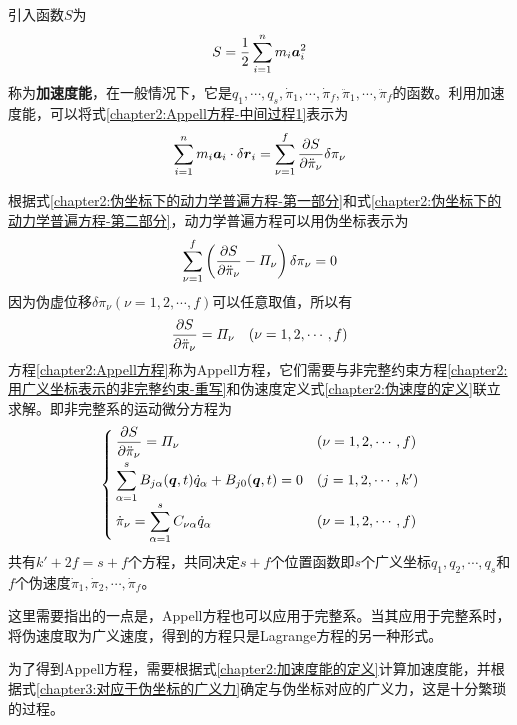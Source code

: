 引入函数$S$为
\begin{equation}
	S = \frac12 \sum_{i=1}^n m_i\boldsymbol{a}_i^2 
	\label{chapter2:加速度能的定义}
\end{equation}
称为{\bf 加速度能}，在一般情况下，它是$q_1,\cdots,q_s, \dot{\pi}_1,\cdots,\dot{\pi}_f, \ddot{\pi}_1,\cdots,\ddot{\pi}_f$的函数。利用加速度能，可以将式\eqref{chapter2:Appell方程-中间过程1}表示为
\begin{equation}
	\sum_{i=1}^n m_i\boldsymbol{a}_i\cdot\delta\boldsymbol{r}_i = \sum_{\nu=1}^f \frac{\partial S}{\partial \ddot{\pi}_\nu} \delta\pi_\nu
	\label{chapter2:伪坐标下的动力学普遍方程-第二部分}
\end{equation}

根据式\eqref{chapter2:伪坐标下的动力学普遍方程-第一部分}和式\eqref{chapter2:伪坐标下的动力学普遍方程-第二部分}，动力学普遍方程可以用伪坐标表示为
\begin{equation}
	\sum_{\nu=1}^f \left(\frac{\partial S}{\partial \ddot{\pi}_\nu} - \varPi_\nu\right) \delta\pi_\nu = 0
\end{equation}
因为伪虚位移$\delta\pi_\nu(\nu=1,2,\cdots,f)$可以任意取值，所以有
\begin{equation}
	\frac{\partial S}{\partial \ddot{\pi}_\nu} = \varPi_\nu \quad (\nu = 1,2,\cdots,f)
	\label{chapter2:Appell方程}
\end{equation}
方程\eqref{chapter2:Appell方程}称为Appell方程，它们需要与非完整约束方程\eqref{chapter2:用广义坐标表示的非完整约束-重写}和伪速度定义式\eqref{chapter2:伪速度的定义}联立求解。即非完整系的运动微分方程为
\begin{equation}
\begin{cases}
	\displaystyle \frac{\partial S}{\partial \ddot{\pi}_\nu} = \varPi_\nu & (\nu = 1,2,\cdots,f) \\[1.5ex]
	\displaystyle \sum_{\alpha=1}^s B_{j\alpha}(\boldsymbol{q},t) \dot{q}_\alpha + B_{j0}(\boldsymbol{q},t) = 0 & (j=1,2,\cdots,k') \\[1.5ex]
	\displaystyle \dot{\pi}_\nu = \sum_{\alpha=1}^s C_{\nu\alpha} \dot{q}_\alpha & (\nu=1,2,\cdots,f)
\end{cases}
\end{equation}
共有$k'+2f=s+f$个方程，共同决定$s+f$个位置函数即$s$个广义坐标$q_1,q_2,\cdots, q_s$和$f$个伪速度$\dot{\pi}_1,\dot{\pi}_2,\cdots,\dot{\pi}_f$。

这里需要指出的一点是，Appell方程也可以应用于完整系。当其应用于完整系时，将伪速度取为广义速度，得到的方程只是Lagrange方程的另一种形式。

为了得到Appell方程，需要根据式\eqref{chapter2:加速度能的定义}计算加速度能，并根据式\eqref{chapter3:对应于伪坐标的广义力}确定与伪坐标对应的广义力，这是十分繁琐的过程。

